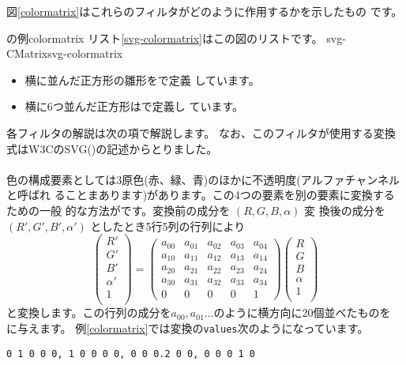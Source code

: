 
図\ref{colormatrix}はこれらのフィルタがどのように作用するかを示したもの
です。

%
    {\protect{}の例}{colormatrix}%
リスト\ref{svg-colormatrix}はこの図のリストです。
{svg-CMatrix}{svg-colormatrix}

\begin{itemize}
 \item 横に並んだ正方形の雛形をで定義
       しています。
 \item 横に6つ並んだ正方形はで定義し
       ています。
\end{itemize}

各フィルタの解説は次の項で解説します。
なお、このフィルタが使用する変換式はW3CのSVG(\cite{SVG11})の記述からとりました。

\paragraph{}
色の構成要素としては3原色(赤、緑、青)のほかに不透明度(アルファチャンネルと呼ばれ
ることまあります)があります。この4つの要素を別の要素に変換するための一般
的な方法がです。変換前の成分を $(R,G,B,\alpha)$ 変
換後の成分を$(R',G',B',\alpha')$ としたとき5行5列の行列により
\[
 \left(\begin{array}{c}
  R'\\G'\\B'\\\alpha'\\1\\
       \end{array}\right)=
\left(\begin{array}{ccccc}
  a_{00} &a_{01}& a_{02} & a_{03} & a_{04} \\
  a_{10} &a_{11}& a_{12} & a_{13} & a_{14} \\
  a_{20} &a_{21}& a_{22} & a_{23} & a_{24} \\
  a_{30} &a_{31}& a_{32} & a_{33} & a_{34} \\
 0 & 0 & 0 & 0 & 1
      \end{array}\right)
 \left(\begin{array}{c}
  R\\G\\B\\\alpha\\1\\
       \end{array}\right)
\]
と変換します。この行列の成分を$a_{00}, a_{01}\dots$のように横方向に20個並べたものを
に与えます。
例\ref{colormatrix}では変換の\texttt{values}次のようになっています。
\begin{center}
\texttt{0 1 0 0 0, 1 0 0 0 0, 0 0 0.2 0 0, 0 0 0 1 0 }

\end{center}
%

